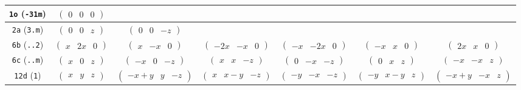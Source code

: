 \documentclass[fleqn,9pt,landscape]{jsarticle}
\begin{document}
\begin{center}
\begin{longtable}{ccccccc}
{\tt 1o} ({\tt -31m}) & $ \begin{pmatrix} 0 & 0 & 0 \end{pmatrix} $ & $  $ & $  $ & $  $ & $  $ & $  $ \\ \hline
{\tt 2a} ({\tt 3.m}) & $ \begin{pmatrix} 0 & 0 & z \end{pmatrix} $ & $ \begin{pmatrix} 0 & 0 & - z \end{pmatrix} $ & $  $ & $  $ & $  $ & $  $ \\ \hline
{\tt 6b} ({\tt ..2}) & $ \begin{pmatrix} x & 2 x & 0 \end{pmatrix} $ & $ \begin{pmatrix} x & - x & 0 \end{pmatrix} $ & $ \begin{pmatrix} - 2 x & - x & 0 \end{pmatrix} $ & $ \begin{pmatrix} - x & - 2 x & 0 \end{pmatrix} $ & $ \begin{pmatrix} - x & x & 0 \end{pmatrix} $ & $ \begin{pmatrix} 2 x & x & 0 \end{pmatrix} $ \\ \hline
{\tt 6c} ({\tt ..m}) & $ \begin{pmatrix} x & 0 & z \end{pmatrix} $ & $ \begin{pmatrix} - x & 0 & - z \end{pmatrix} $ & $ \begin{pmatrix} x & x & - z \end{pmatrix} $ & $ \begin{pmatrix} 0 & - x & - z \end{pmatrix} $ & $ \begin{pmatrix} 0 & x & z \end{pmatrix} $ & $ \begin{pmatrix} - x & - x & z \end{pmatrix} $ \\ \hline
{\tt 12d} ({\tt 1}) & $ \begin{pmatrix} x & y & z \end{pmatrix} $ & $ \begin{pmatrix} - x + y & y & - z \end{pmatrix} $ & $ \begin{pmatrix} x & x - y & - z \end{pmatrix} $ & $ \begin{pmatrix} - y & - x & - z \end{pmatrix} $ & $ \begin{pmatrix} - y & x - y & z \end{pmatrix} $ & $ \begin{pmatrix} - x + y & - x & z \end{pmatrix} $ \\

\end{longtable}
\end{center}
\end{document}

